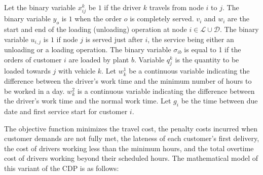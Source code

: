 \documentclass{article}
\begin{document}
Let the binary variable $x^{k}_{ij}$ be $1$ if the driver $k$ travels from node $i$ to $j$. The binary variable $y_o$ is $1$ when the order $o$ is completely served. $v_i$ and $w_i$ are the start and end of the loading (unloading) operation at node $i \in \mathcal{L} \cup \mathcal{D}$. The binary variable $u_{i,j}$ is $1$ if node $j$ is served just after $i$, the service being either an unloading or a loading operation. The binary variable $\sigma_{ib}$ is equal to 1 if the orders of customer $i$ are loaded by plant $b$. Variable $q^k_j$ is the quantity to be loaded towards $j$ with vehicle $k$. Let $w^1_k$ be a continuous variable indicating the difference between the driver's work time and the minimum number of hours to be worked in a day. $w^2_k$ is a continuous variable indicating the difference between the driver's work time and the normal work time. Let $g_i$ be the time between due date and first service start for customer $i$.

The objective function minimizes the travel cost, the penalty costs incurred when customer demands are not fully met, the lateness of each customer's first delivery, the cost of drivers working less than the minimum hours, and the total overtime cost of drivers working beyond their scheduled hours. The mathematical model of this variant of the CDP is as follows:

\end{document}
